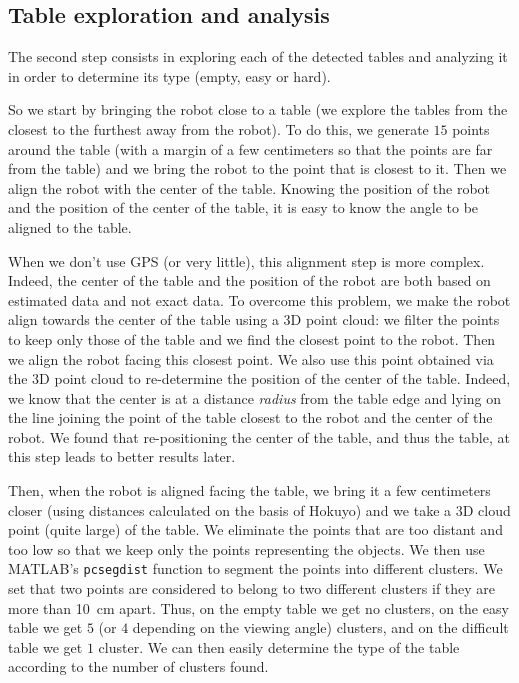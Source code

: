 \documentclass[a4paper, 10pt, conference]{ieeeconf}
\begin{document}
    \subsection{Table exploration and analysis}
    
    The second step consists in exploring each of the detected tables and analyzing it in order to determine its type (empty, easy or hard).
    
    So we start by bringing the robot close to a table (we explore the tables from the closest to the furthest away from the robot). To do this, we generate $15$ points around the table (with a margin of a few centimeters so that the points are far from the table) and we bring the robot to the point that is closest to it. Then we align the robot with the center of the table. Knowing the position of the robot and the position of the center of the table, it is easy to know the angle to be aligned to the table.
    
    When we don't use GPS (or very little), this alignment step is more complex. Indeed, the center of the table and the position of the robot are both based on estimated data and not exact data. To overcome this problem, we make the robot align towards the center of the table using a 3D point cloud: we filter the points to keep only those of the table and we find the closest point to the robot. Then we align the robot facing this closest point. We also use this point obtained via the 3D point cloud to re-determine the position of the center of the table. Indeed, we know that the center is at a distance \emph{radius} from the table edge and lying on the line joining the point of the table closest to the robot and the center of the robot. We found that re-positioning the center of the table, and thus the table, at this step leads to better results later.
    
    Then, when the robot is aligned facing the table, we bring it a few centimeters closer (using distances calculated on the basis of Hokuyo) and we take a 3D cloud point (quite large) of the table. We eliminate the points that are too distant and too low so that we keep only the points representing the objects. We then use MATLAB's \texttt{pcsegdist} function to segment the points into different clusters. We set that two points are considered to belong to two different clusters if they are more than \SI{10}{\centi\meter} apart. Thus, on the empty table we get no clusters, on the easy table we get $5$ (or $4$ depending on the viewing angle) clusters, and on the difficult table we get $1$ cluster. We can then easily determine the type of the table according to the number of clusters found.
    
\end{document}

